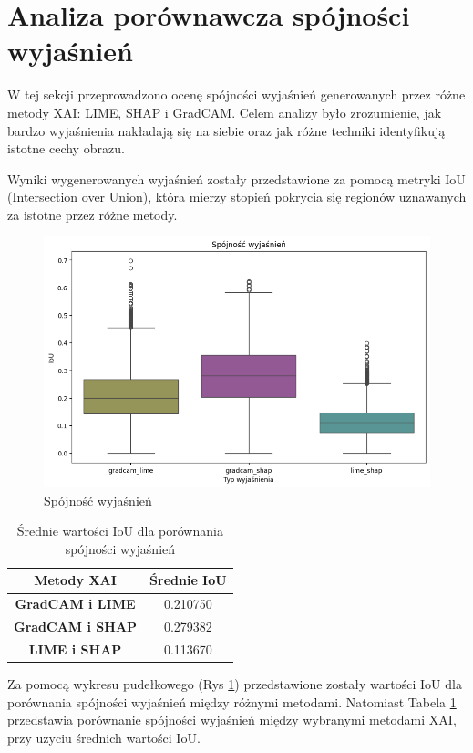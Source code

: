 \section*{Analiza porównawcza spójności wyjaśnień}

W tej sekcji przeprowadzono ocenę spójności wyjaśnień generowanych przez różne metody XAI: LIME, SHAP i GradCAM.
Celem analizy było zrozumienie, jak bardzo wyjaśnienia nakładają się na siebie oraz jak różne techniki identyfikują istotne cechy obrazu.

Wyniki wygenerowanych wyjaśnień zostały przedstawione za pomocą metryki IoU (Intersection over Union), która mierzy stopień pokrycia się regionów uznawanych za istotne przez różne metody.

\begin{figure}[h]
	\centering\includegraphics[width=.9\textwidth]{img/base_coherence}
	\caption{Spójność wyjaśnień}  \label{rys:base_coherence}
\end{figure}

\begin{table}[h]
	\centering
	\begin{tabular}{|c|c|}
		\hline
		\textbf{Metody XAI}     & \textbf{Średnie IoU} \\
		\hline
		\textbf{GradCAM i LIME} & 0.210750             \\
		\hline
		\textbf{GradCAM i SHAP} & 0.279382             \\
		\hline
		\textbf{LIME i SHAP}    & 0.113670             \\
		\hline
	\end{tabular}
	\caption{Średnie wartości IoU dla porównania spójności wyjaśnień}
	\label{tab:base_coherence}
\end{table}

Za pomocą wykresu pudełkowego (Rys \ref{rys:base_coherence}) przedstawione zostały wartości IoU dla porównania spójności wyjaśnień między różnymi metodami.
Natomiast Tabela \ref{tab:base_coherence} przedstawia porównanie spójności wyjaśnień między wybranymi metodami XAI, przy uzyciu średnich wartości IoU.

